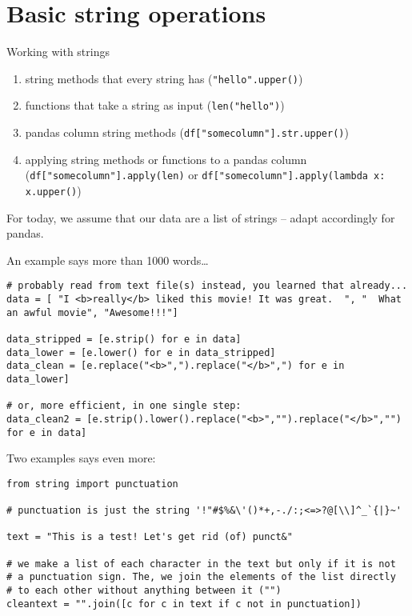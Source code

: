 \section{Basic string operations}

\begin{frame}{Working with strings}
\begin{enumerate}[<+->]
\item string methods that every string has (\texttt{"hello".upper()})
\item functions that take a string as input (\texttt{len("hello")})
\item pandas column string methods (\texttt{df["somecolumn"].str.upper()})
\item applying string methods or functions to a pandas column (\texttt{df["somecolumn"].apply(len)} or \texttt{df["somecolumn"].apply(lambda x: x.upper()})
\end{enumerate}

\pause
For today, we assume that our data are a list of strings -- adapt accordingly for pandas.
\end{frame}


\begin{frame}[fragile]{An example says more than 1000 words\ldots}
\begin{verbatim}
# probably read from text file(s) instead, you learned that already...
data = [ "I <b>really</b> liked this movie! It was great.  ", "  What an awful movie", "Awesome!!!"]

data_stripped = [e.strip() for e in data]
data_lower = [e.lower() for e in data_stripped]
data_clean = [e.replace("<b>",").replace("</b>",") for e in data_lower]

# or, more efficient, in one single step:
data_clean2 = [e.strip().lower().replace("<b>","").replace("</b>","") for e in data]
\end{verbatim}
\end{frame}



\begin{frame}[fragile]{Two examples says even more:}
\begin{verbatim}
from string import punctuation

# punctuation is just the string '!"#$%&\'()*+,-./:;<=>?@[\\]^_`{|}~'

text = "This is a test! Let's get rid (of) punct&"

# we make a list of each character in the text but only if it is not
# a punctuation sign. The, we join the elements of the list directly
# to each other without anything between it ("")
cleantext = "".join([c for c in text if c not in punctuation])
\end{verbatim}
\end{frame}


